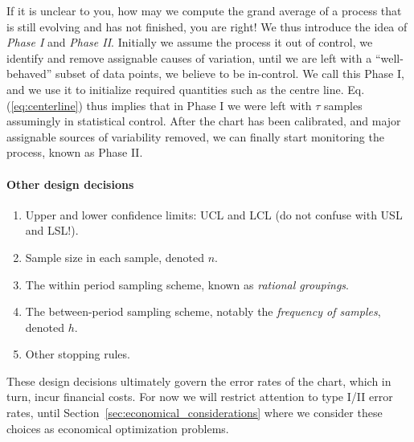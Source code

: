 \documentclass[12pt,a4paper]{report}
\theoremstyle{plain}
\theoremstyle{definition}
\begin{document}
If it is unclear to you, how may we compute the grand average of a process that is still evolving and has not finished, you are right! We thus introduce the idea of \emph{Phase I} and \emph{Phase II}. 
Initially we assume the process it out of control, we identify and remove assignable causes of variation, until we are left with a ``well-behaved'' subset of data points, we believe to be in-control. We call this Phase I, and we use it to initialize required quantities such as the centre line. 
Eq.(\ref{eq:centerline}) thus implies that in Phase I we were left with $\tau$ samples assumingly in statistical control.
After the chart has been calibrated, and major assignable sources of variability removed, we can finally start monitoring the process, known as Phase II.



\begin{tcolorbox}[breakable]
\paragraph{Other design decisions}
\begin{enumerate}
\item Upper and lower confidence limits: UCL and LCL (do not confuse with USL and LSL!).
\item Sample size in each sample, denoted $n$.
\item The within period sampling scheme, known as \emph{rational groupings}.
\item The between-period sampling scheme, notably the \emph{frequency of samples}, denoted $h$. 
\item Other stopping rules.
\end{enumerate}
\end{tcolorbox}


These design decisions ultimately govern the error rates of the chart, which in turn, incur financial costs. 
For now we will restrict attention to type I/II error rates, until Section~\ref{sec:economical_considerations} where we consider these choices as economical optimization problems.
\end{document}
